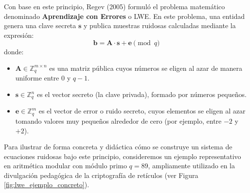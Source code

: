 Con base en este principio, Regev (2005) formuló el problema matemático denominado \textbf{Aprendizaje con Errores} o LWE. En este problema, una entidad genera una clave secreta $\mathbf{s}$ y publica muestras ruidosas calculadas mediante la expresión:
\begin{equation}
	\mathbf{b} = \mathbf{A} \cdot \mathbf{s} + \mathbf{e} \pmod q
\end{equation}
donde:
\begin{itemize}
	\item $\mathbf{A} \in \mathbb{Z}_q^{m \times n}$ es una matriz pública cuyos números se eligen al azar de manera uniforme entre $0$ y $q-1$.
	\item $\mathbf{s} \in \mathbb{Z}_q^n$ es el vector secreto (la clave privada), formado por números pequeños.
	\item $\mathbf{e} \in \mathbb{Z}_q^m$ es el vector de error o ruido secreto, cuyos elementos se eligen al azar tomando valores muy pequeños alrededor de cero (por ejemplo, entre $-2$ y $+2$).
\end{itemize}

Para ilustrar de forma concreta y didáctica cómo se construye un sistema de ecuaciones ruidosas bajo este principio, consideremos un ejemplo representativo en aritmética modular con módulo primo $q = 89$, ampliamente utilizado en la divulgación pedagógica de la criptografía de retículos (ver Figura \ref{fig:lwe_ejemplo_concreto}).

